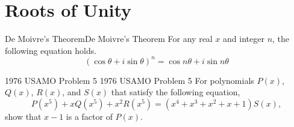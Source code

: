 \documentclass[../../../main.tex]{subfiles}
\begin{document}
\section{Roots of Unity}


\begin{theorem}{De Moivre's Theorem}{De Moivre's Theorem}
For any real $x$ and integer $n$, the following equation holds.
\vspace{-0.8\baselineskip}
\[
(\cos\theta + i\sin\theta)^n = \cos n\theta + i\sin n\theta
\]
\end{theorem}



\begin{problem}{1976 USAMO Problem 5 \medium}{1976 USAMO Problem 5}
For polynomials $P(x)$, $Q(x)$, $R(x)$, and $S(x)$ that satisfy
the following equation,
\[
P(x^5) + xQ(x^5) + x^2 R(x^5)
= (x^4 + x^3 + x^2 + x + 1) S(x),
\]
show that $x - 1$ is a factor of $P(x)$.
\end{problem}
\end{document}
